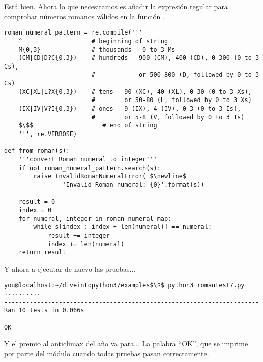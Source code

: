 Está bien. Ahora lo que necesitamos es añadir la expresión regular para comprobar números romanos válidos en la función .

\noindent\begin{minipage}{\textwidth}
\begin{lstlisting}[mathescape=True]
roman_numeral_pattern = re.compile('''
    ^                   # beginning of string
    M{0,3}              # thousands - 0 to 3 Ms
    (CM|CD|D?C{0,3})    # hundreds - 900 (CM), 400 (CD), 0-300 (0 to 3 Cs),
                        #            or 500-800 (D, followed by 0 to 3 Cs)
    (XC|XL|L?X{0,3})    # tens - 90 (XC), 40 (XL), 0-30 (0 to 3 Xs),
                        #        or 50-80 (L, followed by 0 to 3 Xs)
    (IX|IV|V?I{0,3})    # ones - 9 (IX), 4 (IV), 0-3 (0 to 3 Is),
                        #        or 5-8 (V, followed by 0 to 3 Is)
    $\$$                   # end of string
    ''', re.VERBOSE)

def from_roman(s):
    '''convert Roman numeral to integer'''
    if not roman_numeral_pattern.search(s):
        raise InvalidRomanNumeralError( $\newline$
                'Invalid Roman numeral: {0}'.format(s))

    result = 0
    index = 0
    for numeral, integer in roman_numeral_map:
        while s[index : index + len(numeral)] == numeral:
            result += integer
            index += len(numeral)
    return result
\end{lstlisting}
\end{minipage}

Y ahora a ejecutar de nuevo las pruebas...

\noindent\begin{minipage}{\textwidth}
\begin{lstlisting}[mathescape=True]
you@localhost:~/diveintopython3/examples$\$$ python3 romantest7.py
..........
----------------------------------------------------------------------
Ran 10 tests in 0.066s

OK
\end{lstlisting}
\end{minipage}

Y el premio al anticlimax del año va para... La palabra ``OK'', que se imprime por parte del módulo  cuando todas pruebas pasan correctamente.

